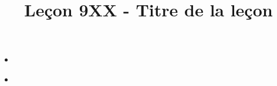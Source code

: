 \documentclass{article}
\title{Leçon 9XX - Titre de la leçon}
\begin{document}
\maketitle

\secrapports

\secindispensables

\secpieges

\secidees

\secquestionsclassiques

\secreferences

\begin{itemize}
\item 
\end{itemize}

\secdev

\begin{itemize}
\item 
\end{itemize}
\end{document}
